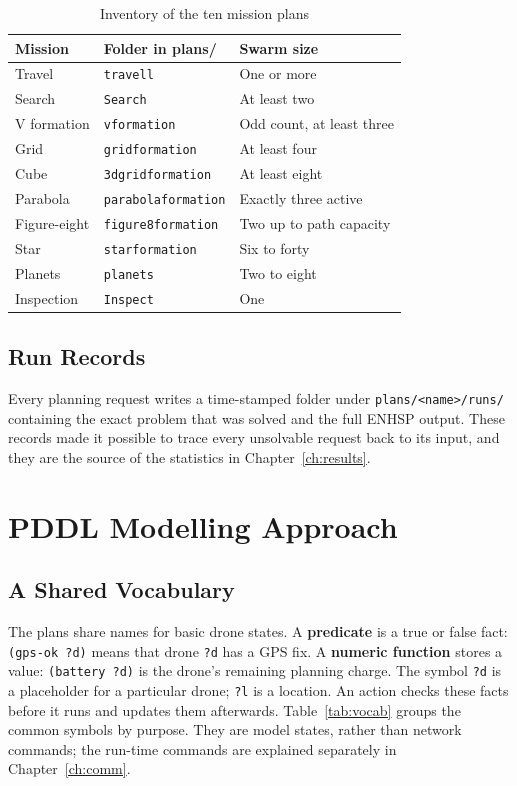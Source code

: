 \documentclass[11pt,a4paper,oneside]{report}
\newcommand{\code}[1]{\texttt{#1}}
\begin{document}
\begin{table}[H]
\caption[Mission inventory]{Inventory of the ten mission plans}\label{tab:inventory}
\small
\begin{tabularx}{\textwidth}{@{}P{0.21\textwidth}P{0.33\textwidth}Y@{}}
\toprule \textbf{Mission} & \textbf{Folder in plans/} & \textbf{Swarm size} \\ \midrule
Travel & \code{travell} & One or more \\
Search & \code{Search} & At least two \\
V formation & \code{vformation} & Odd count, at least three \\
Grid & \code{gridformation} & At least four \\
Cube & \code{3dgridformation} & At least eight \\
Parabola & \code{parabolaformation} & Exactly three active \\
Figure-eight & \code{figure8formation} & Two up to path capacity \\
Star & \code{starformation} & Six to forty \\
Planets & \code{planets} & Two to eight \\
Inspection & \code{Inspect} & One \\
\bottomrule\end{tabularx}
\end{table}

\section{Run Records}
Every planning request writes a time-stamped folder under \code{plans/<name>/runs/} containing
the exact problem that was solved and the full ENHSP output. These records made it possible to
trace every unsolvable request back to its input, and they are the source of the statistics in
Chapter~\ref{ch:results}.

\chapter{PDDL Modelling Approach}\label{ch:model}

\section{A Shared Vocabulary}
The plans share names for basic drone states. A \textbf{predicate} is a true or
false fact: \code{(gps-ok ?d)} means that drone \code{?d} has a GPS fix.
A \textbf{numeric function} stores a value: \code{(battery ?d)} is the drone's
remaining planning charge. The symbol \code{?d} is a placeholder for a particular
drone; \code{?l} is a location. An action checks these facts before it runs and
updates them afterwards. Table~\ref{tab:vocab} groups the common symbols by purpose.
They are model states, rather than network commands; the run-time commands are
explained separately in Chapter~\ref{ch:comm}.
\end{document}
